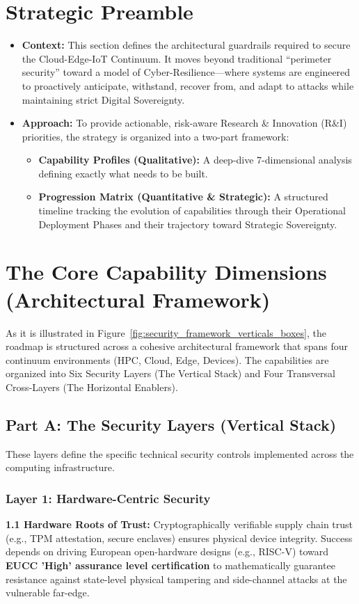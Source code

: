 \documentclass[12pt,a4paper]{article}
\begin{document}
\section{Strategic Preamble}
\begin{itemize}
    \item \textbf{Context:} This section defines the architectural guardrails required to secure the Cloud-Edge-IoT Continuum. It moves beyond traditional ``perimeter security'' toward a model of Cyber-Resilience---where systems are engineered to proactively anticipate, withstand, recover from, and adapt to attacks while maintaining strict Digital Sovereignty.
    \item \textbf{Approach:} To provide actionable, risk-aware Research \& Innovation (R\&I) priorities, the strategy is organized into a two-part framework:
    \begin{itemize}
        \item \textbf{Capability Profiles (Qualitative):} A deep-dive 7-dimensional analysis defining exactly what needs to be built.
        \item \textbf{Progression Matrix (Quantitative \& Strategic):} A structured timeline tracking the evolution of capabilities through their Operational Deployment Phases and their trajectory toward Strategic Sovereignty.
    \end{itemize}
\end{itemize}

\section{The Core Capability Dimensions (Architectural Framework)}
As it is illustrated in Figure~\ref{fig:security_framework_verticals_boxes}, the roadmap is structured across a cohesive architectural framework that spans four continuum environments (HPC, Cloud, Edge, Devices). The capabilities are organized into Six Security Layers (The Vertical Stack) and Four Transversal Cross-Layers (The Horizontal Enablers).

\subsection*{Part A: The Security Layers (Vertical Stack)}
These layers define the specific technical security controls implemented across the computing infrastructure.

\subsubsection*{Layer 1: Hardware-Centric Security}
\textbf{1.1 Hardware Roots of Trust:} Cryptographically verifiable supply chain trust (e.g., TPM attestation, secure enclaves) ensures physical device integrity. Success depends on driving European open-hardware designs (e.g., RISC-V) toward \textbf{EUCC 'High' assurance level certification} \cite{eucc} to mathematically guarantee resistance against state-level physical tampering and side-channel attacks at the vulnerable far-edge.
\end{document}
